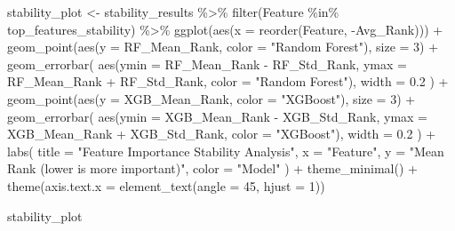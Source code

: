 \documentclass[
  letterpaper,
  DIV=11,
  numbers=noendperiod]{scrreprt}
\newenvironment{Shaded}{\begin{snugshade}}{\end{snugshade}}
\newcommand{\AttributeTok}[1]{\textcolor[rgb]{0.40,0.45,0.13}{#1}}
\newcommand{\DecValTok}[1]{\textcolor[rgb]{0.68,0.00,0.00}{#1}}
\newcommand{\FloatTok}[1]{\textcolor[rgb]{0.68,0.00,0.00}{#1}}
\newcommand{\FunctionTok}[1]{\textcolor[rgb]{0.28,0.35,0.67}{#1}}
\newcommand{\NormalTok}[1]{\textcolor[rgb]{0.00,0.23,0.31}{#1}}
\newcommand{\OtherTok}[1]{\textcolor[rgb]{0.00,0.23,0.31}{#1}}
\newcommand{\SpecialCharTok}[1]{\textcolor[rgb]{0.37,0.37,0.37}{#1}}
\newcommand{\StringTok}[1]{\textcolor[rgb]{0.13,0.47,0.30}{#1}}
\begin{document}
\begin{Shaded}
\begin{Highlighting}[]
\NormalTok{stability\_plot }\OtherTok{\textless{}{-}}\NormalTok{ stability\_results }\SpecialCharTok{\%\textgreater{}\%}
  \FunctionTok{filter}\NormalTok{(Feature }\SpecialCharTok{\%in\%}\NormalTok{ top\_features\_stability) }\SpecialCharTok{\%\textgreater{}\%}
  \FunctionTok{ggplot}\NormalTok{(}\FunctionTok{aes}\NormalTok{(}\AttributeTok{x =} \FunctionTok{reorder}\NormalTok{(Feature, }\SpecialCharTok{{-}}\NormalTok{Avg\_Rank))) }\SpecialCharTok{+}
  \FunctionTok{geom\_point}\NormalTok{(}\FunctionTok{aes}\NormalTok{(}\AttributeTok{y =}\NormalTok{ RF\_Mean\_Rank, }\AttributeTok{color =} \StringTok{"Random Forest"}\NormalTok{), }\AttributeTok{size =} \DecValTok{3}\NormalTok{) }\SpecialCharTok{+}
  \FunctionTok{geom\_errorbar}\NormalTok{(}
    \FunctionTok{aes}\NormalTok{(}\AttributeTok{ymin =}\NormalTok{ RF\_Mean\_Rank }\SpecialCharTok{{-}}\NormalTok{ RF\_Std\_Rank, }\AttributeTok{ymax =}\NormalTok{ RF\_Mean\_Rank }\SpecialCharTok{+}\NormalTok{ RF\_Std\_Rank, }\AttributeTok{color =} \StringTok{"Random Forest"}\NormalTok{),}
    \AttributeTok{width =} \FloatTok{0.2}
\NormalTok{  ) }\SpecialCharTok{+}
  \FunctionTok{geom\_point}\NormalTok{(}\FunctionTok{aes}\NormalTok{(}\AttributeTok{y =}\NormalTok{ XGB\_Mean\_Rank, }\AttributeTok{color =} \StringTok{"XGBoost"}\NormalTok{), }\AttributeTok{size =} \DecValTok{3}\NormalTok{) }\SpecialCharTok{+}
  \FunctionTok{geom\_errorbar}\NormalTok{(}
    \FunctionTok{aes}\NormalTok{(}\AttributeTok{ymin =}\NormalTok{ XGB\_Mean\_Rank }\SpecialCharTok{{-}}\NormalTok{ XGB\_Std\_Rank, }\AttributeTok{ymax =}\NormalTok{ XGB\_Mean\_Rank }\SpecialCharTok{+}\NormalTok{ XGB\_Std\_Rank, }\AttributeTok{color =} \StringTok{"XGBoost"}\NormalTok{),}
    \AttributeTok{width =} \FloatTok{0.2}
\NormalTok{  ) }\SpecialCharTok{+}
  \FunctionTok{labs}\NormalTok{(}
    \AttributeTok{title =} \StringTok{"Feature Importance Stability Analysis"}\NormalTok{,}
    \AttributeTok{x =} \StringTok{"Feature"}\NormalTok{,}
    \AttributeTok{y =} \StringTok{"Mean Rank (lower is more important)"}\NormalTok{,}
    \AttributeTok{color =} \StringTok{"Model"}
\NormalTok{  ) }\SpecialCharTok{+}
  \FunctionTok{theme\_minimal}\NormalTok{() }\SpecialCharTok{+}
  \FunctionTok{theme}\NormalTok{(}\AttributeTok{axis.text.x =} \FunctionTok{element\_text}\NormalTok{(}\AttributeTok{angle =} \DecValTok{45}\NormalTok{, }\AttributeTok{hjust =} \DecValTok{1}\NormalTok{))}

\NormalTok{stability\_plot}
\end{Highlighting}
\end{Shaded}
\end{document}
